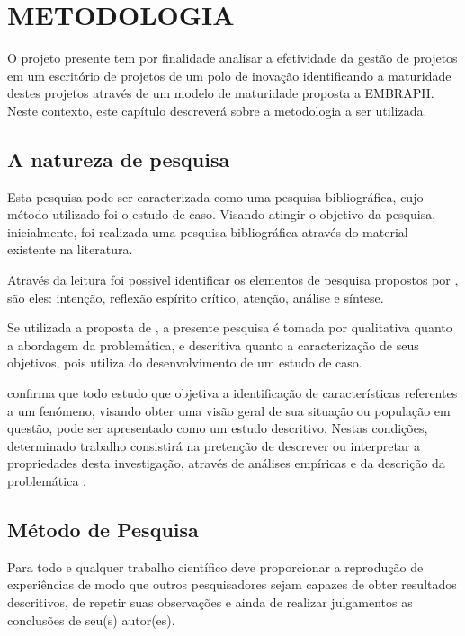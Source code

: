 \chapter{METODOLOGIA}
\thispagestyle{empty}

O projeto presente tem por finalidade analisar a efetividade da gestão de projetos em um escritório de projetos de um polo de inovação identificando a maturidade destes projetos através de um modelo de maturidade proposta a EMBRAPII. Neste contexto, este capítulo descreverá sobre a metodologia a ser utilizada.


\section{A natureza de pesquisa}

Esta pesquisa pode ser caracterizada como uma pesquisa bibliográfica, cujo método utilizado foi o estudo de caso. Visando atingir o objetivo da pesquisa, inicialmente, foi realizada uma pesquisa bibliográfica através do material existente na literatura.

Através da leitura foi possivel identificar os elementos de pesquisa propostos por , são eles: intenção, reflexão espírito crítico, atenção, análise e síntese.

Se utilizada a proposta de , a presente pesquisa é tomada por qualitativa quanto a abordagem da problemática, e descritiva quanto a caracterização de seus objetivos, pois utiliza do desenvolvimento de um estudo de caso.

 confirma que todo estudo que objetiva a identificação de características referentes a um fenómeno, visando obter uma visão geral de sua situação ou população em questão, pode ser apresentado como um estudo descritivo. Nestas condições, determinado trabalho consistirá na pretenção de descrever ou interpretar a propriedades desta investigação, através de análises empíricas e da descrição da problemática \cite{fortin2009fundamentos, lakatos2010fundamentos}.

\section{Método de Pesquisa}

Para  todo e qualquer trabalho científico deve proporcionar a reprodução de experiências de modo que outros pesquisadores sejam capazes de obter resultados descritivos, de repetir suas observações e ainda de realizar julgamentos as conclusões de seu(s) autor(es).


